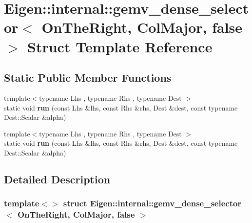 \hypertarget{struct_eigen_1_1internal_1_1gemv__dense__selector_3_01_on_the_right_00_01_col_major_00_01false_01_4}{}\section{Eigen\+:\+:internal\+:\+:gemv\+\_\+dense\+\_\+selector$<$ On\+The\+Right, Col\+Major, false $>$ Struct Template Reference}
\label{struct_eigen_1_1internal_1_1gemv__dense__selector_3_01_on_the_right_00_01_col_major_00_01false_01_4}
\subsection*{Static Public Member Functions}
\begin{DoxyCompactItemize}
\item 
\mbox{\label{struct_eigen_1_1internal_1_1gemv__dense__selector_3_01_on_the_right_00_01_col_major_00_01false_01_4_ae84f031ab7c0cf40c2feeb663e0e9cdc}} 
{\footnotesize template$<$typename Lhs , typename Rhs , typename Dest $>$ }\\static void {\bfseries run} (const Lhs \&lhs, const Rhs \&rhs, Dest \&dest, const typename Dest\+::\+Scalar \&alpha)
\item 
\mbox{\label{struct_eigen_1_1internal_1_1gemv__dense__selector_3_01_on_the_right_00_01_col_major_00_01false_01_4_ae84f031ab7c0cf40c2feeb663e0e9cdc}} 
{\footnotesize template$<$typename Lhs , typename Rhs , typename Dest $>$ }\\static void {\bfseries run} (const Lhs \&lhs, const Rhs \&rhs, Dest \&dest, const typename Dest\+::\+Scalar \&alpha)
\end{DoxyCompactItemize}


\subsection{Detailed Description}
\subsubsection*{template$<$$>$\newline
struct Eigen\+::internal\+::gemv\+\_\+dense\+\_\+selector$<$ On\+The\+Right, Col\+Major, false $>$}



